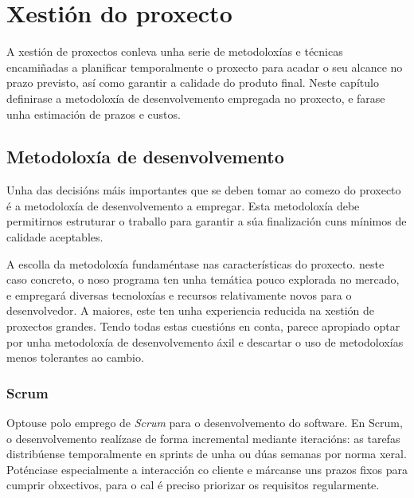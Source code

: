 \chapter{Xestión do proxecto}


A xestión de proxectos conleva unha serie de metodoloxías e técnicas encamiñadas
a planificar temporalmente o proxecto para acadar o seu alcance no prazo
previsto, así como garantir a calidade do produto final. Neste capítulo
definirase a metodoloxía de desenvolvemento empregada no proxecto, e farase unha
estimación de prazos e custos.

\section{Metodoloxía de desenvolvemento}
Unha das decisións máis importantes que se deben tomar ao comezo do proxecto é a
metodoloxía de desenvolvemento a empregar. Esta metodoloxía debe permitirnos
estruturar o traballo para garantir a súa finalización cuns mínimos
de calidade aceptables.
\par
A escolla da metodoloxía fundaméntase nas características do proxecto. neste
caso concreto, o noso programa ten unha temática pouco explorada no
mercado, e empregará diversas tecnoloxías e recursos relativamente novos para o
desenvolvedor. A maiores, este ten unha experiencia reducida na xestión de
proxectos grandes. Tendo todas estas cuestións en conta, parece apropiado optar
por unha metodoloxía de desenvolvemento áxil e descartar o uso de metodoloxías
menos tolerantes ao cambio.

\subsection{Scrum}
Optouse polo emprego de {\it Scrum} para o desenvolvemento do software.
En Scrum, o desenvolvemento realízase de forma incremental mediante iteracións:
as tarefas distribúense temporalmente en sprints de unha ou dúas semanas por
norma xeral. Poténciase especialmente a interacción co cliente e márcanse uns
prazos fixos para cumprir obxectivos, para o cal é preciso priorizar os
requisitos regularmente.

